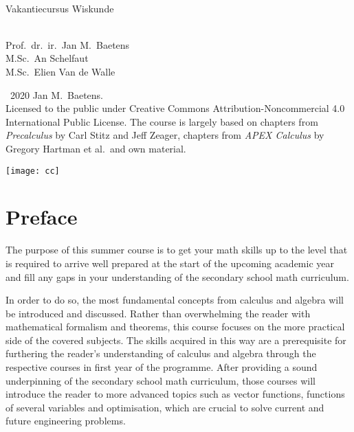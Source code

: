 \thispagestyle{empty}
\cleardoublepage
\thispagestyle{empty}
\begin{titlepage}
\begin{center}
\vspace{5cm}
\HRule \\[1cm]
{\Huge  Vakantiecursus Wiskunde}\\[.7cm]
\HRule \\[3cm]
\end{center}

\begin{center}
{\Large Prof.\ dr.\ ir.\ Jan M.\ Baetens\\
\Large M.Sc.\ An Schelfaut\\
\Large M.Sc.\ Elien Van de Walle}\\[9cm]
\vfill
\end{center}
\end{titlepage}
\thispagestyle{empty}
\vspace*{19cm}
\textcopyright\, 2020 Jan M.\ Baetens.\\
 Licensed to the public under Creative Commons Attribution-Noncommercial 4.0 International Public License. The course is largely based on  chapters from \textit{Precalculus} by Carl Stitz and Jeff Zeager, chapters from \textit{APEX Calculus} by Gregory Hartman et al.\  and own material. 
 	\begin{flushleft}
			\texttt{[image: cc]}
	\end{flushleft}

\chapter*{Preface}
The purpose of this summer course is to get your math skills up to the level that is required to arrive well prepared at the start of the upcoming academic year and fill any gaps in your understanding of the secondary school math curriculum. 

In order to do so, the most fundamental concepts from calculus and algebra will be introduced and discussed. Rather than overwhelming the reader with mathematical formalism and theorems, this course focuses on the more practical side of the covered subjects. The skills acquired in this way are a prerequisite for furthering the reader's understanding of calculus and algebra through the respective courses in first year of the programme. After providing a sound underpinning of the secondary school math curriculum, those courses will introduce the reader to more advanced topics such as vector functions, functions of several variables and optimisation, which are crucial to solve current and future engineering problems. 

